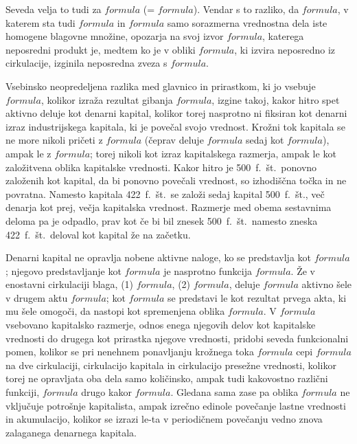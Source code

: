 \documentclass[kapital_02.tex]{subfiles}
\begin{document}
Seveda velja to tudi za \( formula \) (= \( formula \)). Vendar s to razliko, da \( formula \), v katerem sta tudi \( formula \) in \( formula \) samo sorazmerna vrednostna dela iste homogene blagovne množine, opozarja na svoj izvor \( formula \), katerega neposredni produkt je, medtem ko je v obliki \( formula \), ki izvira neposredno iz cirkulacije, izginila neposredna zveza s \( formula \).

Vsebinsko neopredeljena razlika med glavnico in prirastkom, ki jo vsebuje \( formula \), kolikor izraža rezultat gibanja \( formula \), izgine takoj, kakor hitro spet aktivno deluje kot denarni kapital, kolikor torej nasprotno ni fiksiran kot denarni izraz industrijskega kapitala, ki je povečal svojo vrednost. Krožni tok kapitala se ne more nikoli pričeti z \( formula \) (čeprav deluje \( formula \) sedaj kot \( formula \)), ampak le z \( formula \); torej nikoli kot izraz kapitalskega razmerja, ampak le kot založitvena oblika kapitalske vrednosti. Kakor hitro je 500~f.~št.\ ponovno založenih kot kapital, da bi ponovno povečali vrednost, so izhodiščna točka in ne povratna. Namesto kapitala 422~f.~št.\ se založi sedaj kapital 500~f.~št., več denarja kot prej, večja kapitalska vrednost. Razmerje med obema sestavnima deloma pa je odpadlo, prav kot če bi bil znesek 500~f.~št.\ namesto zneska 422~f.~št.\ deloval kot kapital že na začetku.

Denarni kapital ne opravlja nobene aktivne naloge, ko se predstavlja kot \( formula \); njegovo predstavljanje kot \( formula \) je nasprotno funkcija \( formula \). Že v enostavni cirkulaciji blaga, (1) \( formula \), (2) \( formula \), deluje \( formula \) aktivno šele v drugem aktu \( formula \); kot \( formula \) se predstavi le kot rezultat prvega akta, ki mu šele omogoči, da nastopi kot spremenjena oblika \( formula \). V \( formula \) vsebovano kapitalsko razmerje, odnos enega njegovih delov kot kapitalske vrednosti do drugega kot prirastka njegove vrednosti, pridobi seveda funkcionalni pomen, kolikor se pri nenehnem ponavljanju krožnega toka \( formula \) cepi \( formula \) na dve cirkulaciji, cirkulacijo kapitala in cirkulacijo presežne vrednosti, kolikor torej ne opravljata oba dela samo količinsko, ampak tudi kakovostno različni funkciji, \( formula \) drugo kakor \( formula \). Gledana sama zase pa oblika \( formula \) ne vključuje potrošnje kapitalista, ampak izrečno edinole povečanje lastne vrednosti in akumulacijo, kolikor se izrazi le-ta v periodičnem povečanju vedno znova zalaganega denarnega kapitala.
\end{document}
